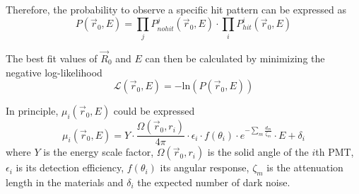 Therefore, the probability to observe a specific hit pattern can be expressed as
\begin{equation}
  P(\vec{r}_0, E) = \prod_j P^j_{nohit}(\vec{r}_0, E) \cdot \prod_i P^i_{hit}(\vec{r}_0, E)
\end{equation}

The best fit values of $\vec{R}_0$ and $E$ can then be calculated by minimizing the negative log-likelihood
\begin{equation}
  \label{eq:juno:rec:charge_likelihood}
  \mathcal{L}(\vec{r}_0, E) = - \mathrm{ln}(P(\vec{r}_0,E))
\end{equation}

In principle, $\mu_i(\vec{r}_0, E)$ could be expressed
\begin{equation}
  \label{eq:juno:rec:mu_i}
  \mu_i(\vec{r}_0, E) = Y \cdot \frac{\Omega(\vec{r}_0, r_i)}{4 \pi} \cdot \epsilon_i \cdot f(\theta_i) \cdot e^{-\sum_m \frac{d_m}{\zeta_m}}\cdot E + \delta_i
\end{equation}
where $Y$ is the energy scale factor, $\Omega(\vec{r}_0, r_i)$ is the solid angle of the $i$th PMT, $\epsilon_i$ is its detection efficiency, $f(\theta_i)$ its angular response, $\zeta_m$ is the attenuation length in the materials and $\delta_i$ the expected number of dark noise.

